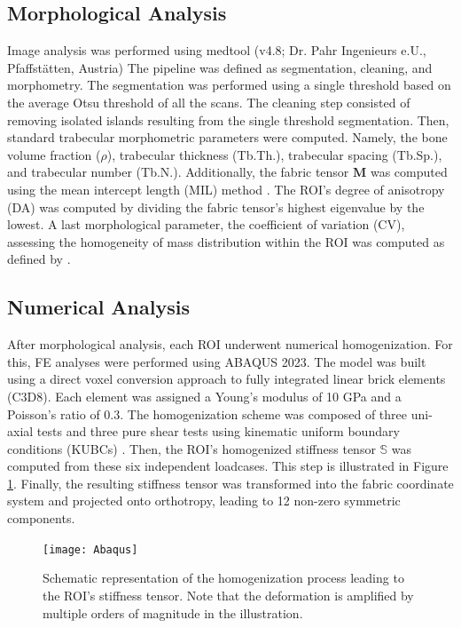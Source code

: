 \documentclass[a4paper,fleqn]{DC_ArtStyle}
\begin{document}
	\subsection{Morphological Analysis}
	Image analysis was performed using medtool (v4.8; Dr. Pahr Ingenieurs e.U., Pfaffstätten, Austria)
	The pipeline was defined as segmentation, cleaning, and morphometry.
	The segmentation was performed using a single threshold based on the average Otsu threshold \cite{Otsu1979} of all the scans.
	The cleaning step consisted of removing isolated islands resulting from the single threshold segmentation.
	Then, standard trabecular morphometric parameters were computed.
	Namely, the bone volume fraction ($\rho$), trabecular thickness (Tb.Th.), trabecular spacing (Tb.Sp.), and trabecular number (Tb.N.).
	Additionally, the fabric tensor $\mathbf{M}$ was computed using the mean intercept length (MIL) method \cite{Moreno2014}.
	The ROI's degree of anisotropy (DA) was computed by dividing the fabric tensor's highest eigenvalue by the lowest.
	A last morphological parameter, the coefficient of variation (CV), assessing the homogeneity of mass distribution within the ROI was computed as defined by \citeauthor{Panyasantisuk2015} \cite{Panyasantisuk2015}.

	\subsection{Numerical Analysis}
	After morphological analysis, each ROI underwent numerical homogenization.
	For this, \textmu FE analyses were performed using ABAQUS 2023.
	The model was built using a direct voxel conversion approach to fully integrated linear brick elements (C3D8).
	Each element was assigned a Young's modulus of 10 GPa and a Poisson's ratio of 0.3.
	The homogenization scheme was composed of three uni-axial tests and three pure shear tests using kinematic uniform boundary conditions (KUBCs) \cite{Panyasantisuk2015}.
	Then, the ROI's homogenized stiffness tensor $\mathbb{S}$ was computed from these six independent loadcases.
	This step is illustrated in Figure \ref{FigHomogenization}.
	Finally, the resulting stiffness tensor was transformed into the fabric coordinate system and projected onto orthotropy, leading to 12 non-zero symmetric components.

	\begin{figure}
		\texttt{[image: Abaqus]}
		\caption{Schematic representation of the homogenization process leading to the ROI's stiffness tensor.
				 Note that the deformation is amplified by multiple orders of magnitude in the illustration.}
		\label{FigHomogenization}
	\end{figure}
\end{document}
